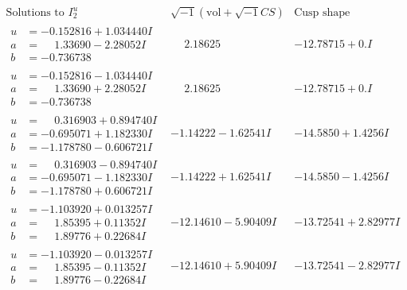 \documentclass[1p]{elsarticle_modified}
\theoremstyle{definition}
\newcommand{\I}{\sqrt{-1}}
\begin{document}
$$\begin{array}{c|c|c}  
\text{Solutions to }I^u_{2}& \I (\text{vol} + \sqrt{-1}CS) & \text{Cusp shape}\\
 \hline 
\begin{aligned}
u &= -0.152816 + 1.034440 I \\
a &= \phantom{-}1.33690 - 2.28052 I \\
b &= -0.736738\phantom{ +0.000000I}\end{aligned}
 & \phantom{-}2.18625\phantom{ +0.000000I} & -12.78715 + 0. I\phantom{ +0.000000I} \\ \hline\begin{aligned}
u &= -0.152816 - 1.034440 I \\
a &= \phantom{-}1.33690 + 2.28052 I \\
b &= -0.736738\phantom{ +0.000000I}\end{aligned}
 & \phantom{-}2.18625\phantom{ +0.000000I} & -12.78715 + 0. I\phantom{ +0.000000I} \\ \hline\begin{aligned}
u &= \phantom{-}0.316903 + 0.894740 I \\
a &= -0.695071 + 1.182330 I \\
b &= -1.178780 - 0.606721 I\end{aligned}
 & -1.14222 - 1.62541 I & -14.5850 + 1.4256 I \\ \hline\begin{aligned}
u &= \phantom{-}0.316903 - 0.894740 I \\
a &= -0.695071 - 1.182330 I \\
b &= -1.178780 + 0.606721 I\end{aligned}
 & -1.14222 + 1.62541 I & -14.5850 - 1.4256 I \\ \hline\begin{aligned}
u &= -1.103920 + 0.013257 I \\
a &= \phantom{-}1.85395 + 0.11352 I \\
b &= \phantom{-}1.89776 + 0.22684 I\end{aligned}
 & -12.14610 - 5.90409 I & -13.72541 + 2.82977 I \\ \hline\begin{aligned}
u &= -1.103920 - 0.013257 I \\
a &= \phantom{-}1.85395 - 0.11352 I \\
b &= \phantom{-}1.89776 - 0.22684 I\end{aligned}
 & -12.14610 + 5.90409 I & -13.72541 - 2.82977 I \\ \hline\begin{aligned}

\end{aligned}
\end{array}$$
\end{document}
